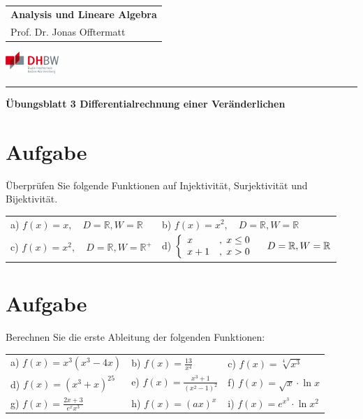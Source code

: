 \documentclass[fontsize=11pt, parskip=half]{scrartcl}
\newcommand{\R}{\mathbb{R}}
\begin{document}
\noindent
\begin{tabular}{l}
    \textbf{Analysis und Lineare Algebra} \\    
    Prof. Dr. Jonas Offtermatt
\end{tabular}
\hfill \includegraphics[width=2cm]{DHBW.pdf}\\
\rule{\textwidth}{0.5pt}


\begin{center}
    \Large
    \textbf{Übungsblatt 3 Differentialrechnung einer Veränderlichen}
\end{center}
\section{Aufgabe}
Überprüfen Sie folgende Funktionen auf Injektivität, Surjektivität und Bijektivität.

\begin{tabular}{ll}
    a) $\displaystyle{ f(x)=x,\quad D=\R, W=\R}$ & b) $\displaystyle{
    f(x)=x^2,\quad D=\R, W=\R}$  \\
    c) $\displaystyle{
    f(x)=x^2,\quad D=\R, W=\R^+}$ & 
    d) $\left\{ \begin{array}{ll}
        x & ,\hspace{0.1cm} x \leq 0 \\
        x+1 & ,\hspace{0.1cm} x>0
        \end{array} \right.\quad D=\R, W=\R$ 
    \end{tabular}


\section{Aufgabe}

Berechnen Sie die erste Ableitung der folgenden Funktionen: \\
\begin{tabular}{lll}
a) $\displaystyle{ f(x)=x^3(x^3-4x)}$ & b) $\displaystyle{
f(x)=\frac{13}{x^4}}$ & c) $\displaystyle{ f(x)=\sqrt[4]{x^3}}$ \\
d) $\displaystyle{ f(x)=(x^3+x)^{25}}$ & e) $\displaystyle{
f(x)=\frac{x^3+1}{(x^2-1)^2}}$ & f) $\displaystyle{ f(x)=\sqrt{x}
\cdot \ln x}$ \\ g) $\displaystyle{ f(x)=\frac{2x+3}{e^x x^3}}$ & h)
$\displaystyle{ f(x)=(ax)^x}$ & i) $\displaystyle{ f(x)=e^{x^3}\cdot
\ln x^2}$
\end{tabular}
\end{document}

